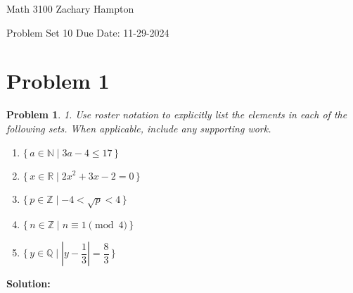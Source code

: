 \documentclass[12pt]{article}
\newtheorem{problem}{Problem}
\theoremstyle{definition}
\begin{document}
Math 3100 \hfill Zachary Hampton

Problem Set 10 \hfill Due Date: 11-29-2024

\bigskip

\section*{Problem 1}

\begin{problem}
1. Use roster notation to explicitly list the elements in each of the following sets. When applicable, include any supporting work.

\begin{enumerate}[label=(\alph*)]
    \item $\{\, a \in \mathbb{N} \mid 3a - 4 \leq 17 \,\}$
    \item $\{\, x \in \mathbb{R} \mid 2x^2 + 3x - 2 = 0 \,\}$
    \item $\{\, p \in \mathbb{Z} \mid -4 < \sqrt{p} < 4 \,\}$
    \item $\{\, n \in \mathbb{Z} \mid n \equiv 1 \pmod{4} \,\}$
    \item $\{\, y \in \mathbb{Q} \mid \left| y - \dfrac{1}{3} \right| = \dfrac{8}{3} \,\}$
\end{enumerate}
\end{problem}

\textbf{Solution:}
\end{document}
